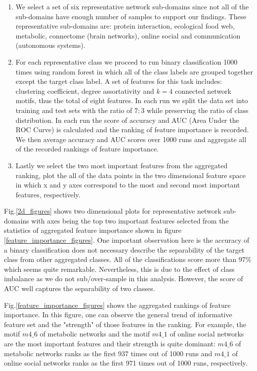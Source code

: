 \documentclass{article}
\begin{document}
\begin{enumerate}
	\item We select a set of six representative network sub-domains since not all of the sub-domains have enough number of samples to support our findings. These representative sub-domains are: protein interaction, ecological food web, metabolic, connectome (brain networks),  online social and communication (autonomous systems).
	\item For each representative class we proceed to run binary classification 1000 times using random forest in which all of the class labels are grouped together except the target class label. A set of features for this task includes: clustering coefficient, degree assortativity and $k = 4$ connected network motifs, thus the total of eight features. In each run we split the data set into training and test sets with the ratio of $7:3$ while preserving the ratio of class distribution. In each run the score of accuracy and AUC (Area Under the ROC Curve) is calculated and the ranking of feature importance is recorded. We then average accuracy and AUC scores over 1000 runs and aggregate all of the recorded rankings of feature importance.
	\item Lastly we select the two most important features from the aggregated ranking, plot the all of the data points in the two dimensional feature space in which x and y axes correspond to the most and second most important features, respectively.
\end{enumerate}

Fig.\ref{2d_figures} shows two dimensional plots for representative network sub-domains with axes being the top two important features selected from the statistics of aggregated feature importance shown in figure \ref{feature_importance_figures}. One important observation here is the accuracy of a binary classification does not necessary describe the separability of the target class from other aggregated classes. All of the classifications score more than 97\% which seems quite remarkable. Nevertheless, this is due to the effect of class imbalance as we do not sub/over-sample in this analysis. However, the score of AUC well captures the separability of two classes. 

Fig.\ref{feature_importance_figures} shows the aggregated rankings of feature importance. In this figure, one can observe the general trend of informative feature set and the "strength" of those features in the ranking. For example, the motif $m4\_6$ of metabolic networks and the motif $m4\_1$ of online social networks are the most important features and their strength is quite dominant:  $m4\_6$ of metabolic networks ranks as the first 937 times out of 1000 runs and $m4\_1$ of online social networks ranks as the first 971 times  out of 1000 runs, respectively.
\end{document}
